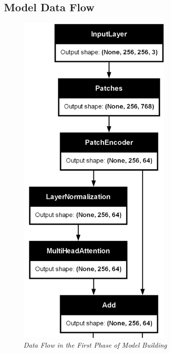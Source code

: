 \subsection{Model Data Flow}

\begin{figure}[htbp]
    \centering
    \includegraphics[width=3in]{img/1STPHASE.png}
    \caption{\textit{Data Flow in the First Phase of Model Building}}
\end{figure}

